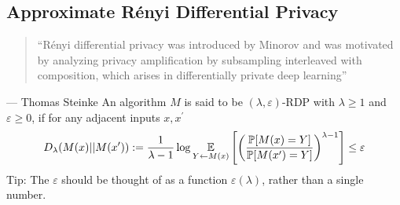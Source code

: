 \documentclass[10pt]{article}
\begin{document}
\subsection{Approximate Rényi Differential Privacy} 
\begin{quote}
    ``Rényi differential privacy was introduced by Minorov and was motivated by analyzing privacy amplification by subsampling interleaved with composition, which arises in differentially private deep learning'' 
\end{quote}
\small 
--- Thomas Steinke 
  An algorithm $M$ is said to be $(\lambda, \varepsilon)$-RDP with $\lambda \geq 1$ and $\varepsilon \geq 0$, if for any adjacent inputs $x, x^{\prime}$ 
\begin{equation}
    D_{\lambda}(M(x) || M(x^{\prime})
) : = \frac{1}{\lambda-1} \log \mathop{\mathbb{E} \displaystyle}_{Y \gets M(x)} \left[ \left( \frac{\mathop{\mathbb{P} \displaystyle}[M(x) = Y]}{\mathop{\mathbb{P} \displaystyle}[M(x^{\prime}) = Y]} \right)^{\lambda-1} \right] \leq \varepsilon
\end{equation}
\alert{Tip:} The $\varepsilon$ should be thought of as a function $\varepsilon(\lambda)$, rather than a single number. 
\end{document}
